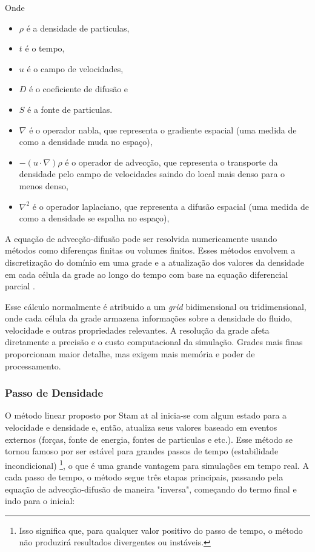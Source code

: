 Onde 
\begin{itemize}
  \item $\rho$ é a densidade de particulas,
  \item $t$ é o tempo,
  \item $u$ é o campo de velocidades,
  \item $D$ é o coeficiente de difusão e
  \item $S$ é a fonte de particulas.
  \item $\nabla$ é o operador nabla, que representa o gradiente espacial (uma medida de como a densidade muda no espaço),
  \item $-(u \cdot \nabla)\rho$ é o operador de advecção, que representa o transporte da densidade pelo campo de velocidades saindo do local mais denso para o menos denso,
  \item $\nabla^2$ é o operador laplaciano, que representa a difusão espacial (uma medida de como a densidade se espalha no espaço),
\end{itemize}

A equação de advecção-difusão pode ser resolvida numericamente usando métodos como diferenças finitas ou volumes finitos. Esses métodos envolvem a discretização do domínio em uma grade e a atualização dos valores da densidade em cada célula da grade ao longo do tempo com base na equação diferencial parcial \cite{Stam2003}.

Esse cálculo normalmente é atribuido a um \textit{grid} bidimensional ou tridimensional, onde cada célula da grade armazena informações sobre a densidade do fluido, velocidade e outras propriedades relevantes. A resolução da grade afeta diretamente a precisão e o custo computacional da simulação. Grades mais finas proporcionam maior detalhe, mas exigem mais memória e poder de processamento.

\subsubsection{Passo de Densidade}
O método linear proposto por Stam at al \cite{Stam2003} inicia-se com algum estado para a velocidade e densidade e, então, atualiza seus valores baseado em eventos externos (forças, fonte de energia, fontes de particulas e etc.). Esse método se tornou famoso por ser estável para grandes passos de tempo (estabilidade incondicional) \footnote{Isso significa que, para qualquer valor positivo do passo de tempo, o método não produzirá resultados divergentes ou instáveis.}, o que é uma grande vantagem para simulações em tempo real. A cada passo de tempo, o método segue três etapas principais, passando pela equação de advecção-difusão de maneira "inversa", começando do termo final e indo para o inicial:

